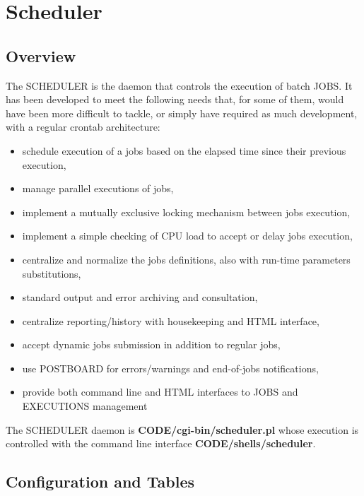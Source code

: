 \section{Scheduler}
\label{scheduler}

\subsection{Overview}

The SCHEDULER is the daemon that controls the execution of \webobs batch JOBS. It has been developed to meet the following needs that,
for some of them, would have been more difficult to tackle, or simply have required as much development, with a regular crontab architecture:

\begin{itemize}
\item   schedule execution of a jobs based on the elapsed time since their previous execution,
\item   manage parallel executions of jobs,
\item   implement a mutually exclusive locking mechanism between jobs execution,
\item   implement a simple checking of CPU load to accept or delay jobs execution,
\item   centralize and normalize the jobs definitions, also with run-time parameters substitutions,
\item   standard output and error archiving and consultation,
\item   centralize reporting/history with housekeeping and HTML interface,
\item   accept dynamic jobs submission in addition to regular jobs,
\item   use \webobs POSTBOARD for errors/warnings and end-of-jobs notifications,
\item   provide both command line and HTML interfaces to JOBS and EXECUTIONS management 
\end{itemize}

The SCHEDULER daemon is \textbf{CODE/cgi-bin/scheduler.pl} whose execution is controlled with the command line interface \textbf{CODE/shells/scheduler}.

\subsection{Configuration and Tables}


